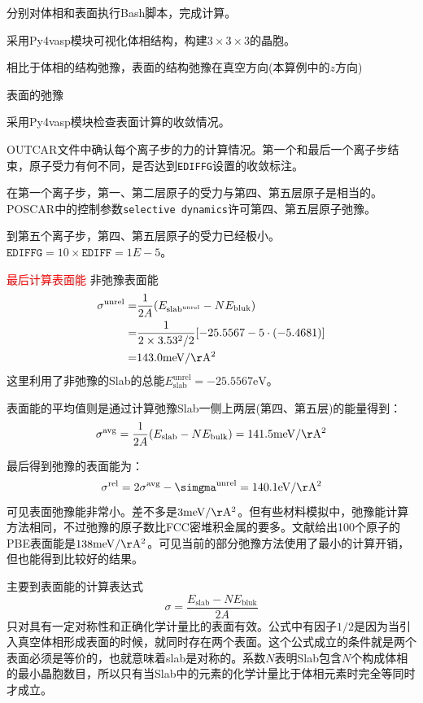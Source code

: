 分别对体相和表面执行\textrm{Bash}脚本，完成计算。

采用\textrm{Py4vasp}模块可视化体相结构，构建$3\times3\times3$的晶胞。

相比于体相的结构弛豫，表面的结构弛豫在真空方向(本算例中的$z$方向)

表面的弛豫

采用\textrm{Py4vasp}模块检查表面计算的收敛情况。

\textrm{OUTCAR}文件中确认每个离子步的力的计算情况。第一个和最后一个离子步结束，原子受力有何不同，是否达到\texttt{EDIFFG}设置的收敛标注。

在第一个离子步，第一、第二层原子的受力与第四、第五层原子是相当的。\textrm{POSCAR}中的控制参数\texttt{selective dynamics}许可第四、第五层原子弛豫。

到第五个离子步，第四、第五层原子的受力已经极小。$\mathtt{EDIFFG}=10\times\mathtt{EDIFF}=1E-5$。

\textcolor{red}{最后计算表面能}
非弛豫表面能
\begin{displaymath}
	\begin{aligned}
		\sigma^{\mathrm{unrel}}=&\dfrac1{2A}(E_{\mathrm{slab}^{\mathrm{unrel}}}-NE_{\mathrm{bluk}})\\
		=&\dfrac1{2\times3.53^2/2}[-25.5567-5\cdot(-5.4681)]\\
		=&143.0\mathrm{meV/\AA^2}
	\end{aligned}
\end{displaymath}
这里利用了非弛豫的\textrm{Slab}的总能$E_{\mathrm{slab}}^{\mathrm{unrel}}=-25.5567\mathrm{eV}$。

表面能的平均值则是通过计算弛豫\textrm{Slab}一侧上两层(第四、第五层)的能量得到：
\begin{displaymath}
	\sigma^{\mathrm{avg}}=\dfrac1{2A}(E_{\mathrm{slab}}-NE_{\mathrm{bulk}})=141.5\mathrm{meV/\AA^2}
\end{displaymath}

最后得到弛豫的表面能为：
\begin{displaymath}
	\sigma^{\mathrm{rel}}=2\sigma^{\mathrm{avg}}-\simgma^{\mathrm{unrel}}=140.1\mathrm{eV/\AA^2}
\end{displaymath}
可见表面弛豫能非常小。差不多是$3\mathrm{meV/\AA^2}$。但有些材料模拟中，弛豫能计算方法相同，不过弛豫的原子数比\textrm{FCC}密堆积金属的要多。文献给出100个原子的\textrm{PBE}表面能是$138\mathrm{meV/\AA^2}$。可见当前的部分弛豫方法使用了最小的计算开销，但也能得到比较好的结果。

主要到表面能的计算表达式
\begin{displaymath}
	\sigma=\dfrac{E_{\mathrm{slab}}-NE_{\mathrm{bluk}}}{2A}
\end{displaymath}
只对具有一定对称性和正确化学计量比的表面有效。公式中有因子$1/2$是因为当引入真空体相形成表面的时候，就同时存在两个表面。这个公式成立的条件就是两个表面必须是等价的，也就意味着\textrm{slab}是对称的。系数$N$表明\textrm{Slab}包含$N$个构成体相的最小晶胞数目，所以只有当\textrm{Slab}中的元素的化学计量比于体相元素时完全等同时才成立。

